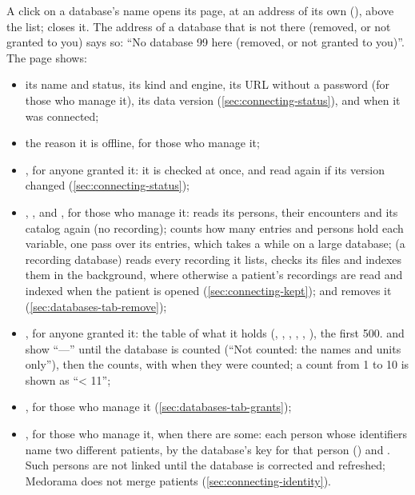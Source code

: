 A click on a database's name opens its page, at an address of its own (),
above the list;  closes it. The address of a database that is not there
(removed, or not granted to you) says so: ``No database 99 here (removed, or not granted to
you)''. The page shows:
\begin{itemize}
\item its name and status, its kind and engine, its URL without a password (for those who manage
  it), its data version (\cref{sec:connecting-status}), and when it was connected;
\item the reason it is offline, for those who manage it;
\item {}, for anyone granted it: it is checked at once, and read again if its version
  changed (\cref{sec:connecting-status});
\item {}, ,  and , for those
  who manage it:  reads its persons, their encounters and its catalog again (no
  recording);  counts how many entries and persons hold each variable, one pass
  over its entries, which takes a while on a large database;  (a
  recording database) reads every recording it lists, checks its files and indexes them in the
  background, where otherwise a patient's recordings are read and indexed when the patient is
  opened (\cref{sec:connecting-kept}); and  removes it
  (\cref{sec:databases-tab-remove});
\item {}, for anyone granted it: the table of what it holds (,
  , , , , ), the first 500.  and
   show ``---'' until the database is counted (``Not counted: the names and units
  only''), then the counts, with when they were counted; a count from 1 to 10 is shown as
  ``< 11'';
\item {}, for those who manage it (\cref{sec:databases-tab-grants});
\item {}, for those who manage it, when there are some: each person whose
  identifiers name two different patients, by the database's key for that person () and . Such persons are not linked until the database
  is corrected and refreshed; Medorama does not merge patients (\cref{sec:connecting-identity}).
\end{itemize}

